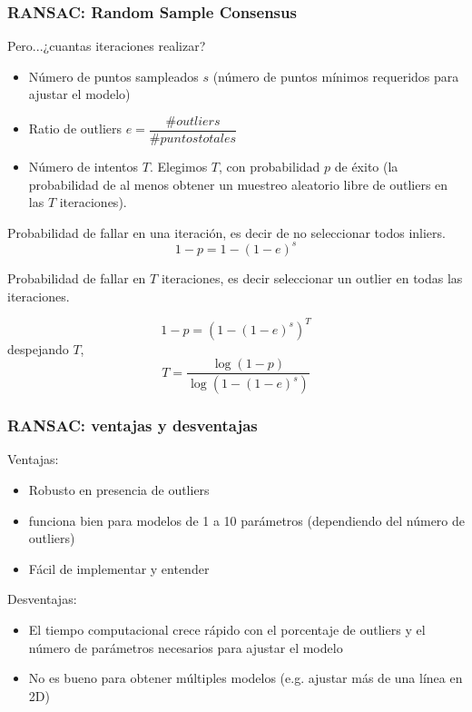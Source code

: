 \begin{frame}
	\frametitle{RANSAC: Random Sample Consensus}
	\footnotesize
	
	Pero...¿cuantas iteraciones realizar?
	
	\begin{itemize}
		\item Número de puntos sampleados $s$ (número de puntos mínimos requeridos para ajustar el modelo)
		\item Ratio de outliers $e = \dfrac{\# outliers}{\# puntos totales}$
		\item Número de intentos $T$.
		Elegimos $T$, con probabilidad $p$ de éxito (la probabilidad de al menos obtener un muestreo aleatorio libre de outliers en las $T$ iteraciones).
	\end{itemize}
	
	Probabilidad de fallar en una iteración, es decir de no seleccionar todos inliers.
	\begin{equation*}
		1-p = 1 - (1 - e)^{s}
	\end{equation*} 
	
	
	Probabilidad de fallar en $T$ iteraciones, es decir seleccionar un outlier en todas las iteraciones.
	
	\begin{equation*}
		1-p = (1 - (1 - e)^{s})^{T}
	\end{equation*} 
	despejando $T$,
	\begin{equation*}
		T = \dfrac{\log(1-p)}{\log(1-(1-e)^{s})}
	\end{equation*} 
	
\end{frame}

\begin{frame}
	\frametitle{RANSAC: ventajas y desventajas}
	\footnotesize
	Ventajas:
	\begin{itemize}
		\item Robusto en presencia de outliers
		\item funciona bien para modelos de 1 a 10 parámetros (dependiendo del número de outliers)
		\item Fácil de implementar y entender
	\end{itemize}
	Desventajas:
	\begin{itemize}
		\item El tiempo computacional crece rápido con el porcentaje de outliers y el número de parámetros necesarios para ajustar el modelo
		\item No es bueno para obtener múltiples modelos (e.g. ajustar más de una línea en 2D)
	\end{itemize}
\end{frame}

